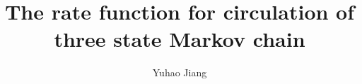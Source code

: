 \documentclass[a4paper,11pt]{article}
\newcommand{\paperfont}{\fontsize{11pt}{1.2\baselineskip}\selectfont}
\begin{document}
	
\theoremstyle{definition}
\makeatletter
\thm@headfont{\bf}
\makeatother
\newtheorem{theorem}{Theorem}[section]
\newtheorem{definition}[theorem]{Definition}
\newtheorem{lemma}[theorem]{Lemma}
\newtheorem{proposition}[theorem]{Proposition}
\newtheorem{corollary}[theorem]{Corollary}
\newtheorem{remark}[theorem]{Remark}
\newtheorem{example}[theorem]{Example}
\newtheorem{assumption}[theorem]{Assumption}

\lhead{}
\rhead{}
\lfoot{}
\rfoot{}

\renewcommand{\refname}{References}
\renewcommand{\figurename}{Figure}
\renewcommand{\tablename}{Table}
\renewcommand{\proofname}{Proof}
	
\newcommand{\diag}{\mathrm{diag}}
\newcommand{\tr}{\mathrm{tr}}
\newcommand{\re}{\mathrm{Re}}
\newcommand{\one}{\mathbbm{1}}
\newcommand{\Pnum}{\mathbb{P}}
\newcommand{\Enum}{\mathbb{E}}
\newcommand{\Rnum}{\mathbb{R}}
\newcommand{\dnum}{\mathrm{d}}
\newcommand{\hyper}{{}_2F_1}
\newcommand{\confl}{{}_1F_1}

\title{The rate function for circulation of three state Markov chain}

\author{Yuhao Jiang}
\date{\zhtoday}

\maketitle
\thispagestyle{empty}

\paperfont

\begin{abstract}
\end{abstract}
\end{document}
